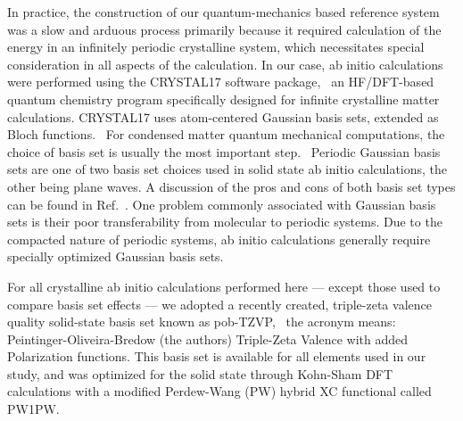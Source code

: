 \documentclass[titlepage,11pt]{article}
\begin{document}
In practice, the construction of our quantum-mechanics based reference system was a slow and arduous process primarily because it required calculation of the energy in an infinitely periodic crystalline system, which necessitates special consideration in all aspects of the calculation. In our case, ab initio calculations were performed using the CRYSTAL17 software package,~\cite{Crystal17,Crystal17Manual} an HF/DFT-based quantum chemistry program specifically designed for infinite crystalline matter calculations. CRYSTAL17 uses atom-centered Gaussian basis sets, extended as Bloch functions.~\cite{Crystal17Manual} For condensed matter quantum mechanical computations, the choice of basis set is usually the most important step.~\cite{Peintinger2013,Crystal17Manual} Periodic Gaussian basis sets are one of two basis set choices used in solid state ab initio calculations, the other being plane waves. A discussion of the pros and cons of both basis set types can be found in Ref.~. One problem commonly associated with Gaussian basis sets is their poor transferability from molecular to periodic systems. Due to the compacted nature of periodic systems, ab initio calculations generally require specially optimized Gaussian basis sets.~\cite{Peintinger2013}

For all crystalline ab initio calculations performed here --- except those used to compare basis set effects --- we adopted a recently created, triple-zeta valence quality solid-state basis set known as pob-TZVP,~\cite{Peintinger2013,Laun2018} the acronym means: Peintinger-Oliveira-Bredow (the authors) Triple-Zeta Valence with added Polarization functions. This basis set is available for all elements used in our study, and was optimized for the solid state through Kohn-Sham DFT calculations with a modified Perdew-Wang (PW) hybrid XC functional called PW1PW.~\cite{PW1PW}
\end{document}
